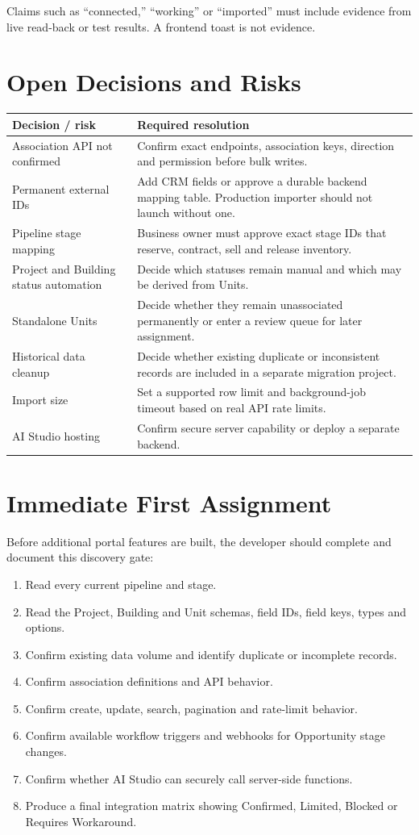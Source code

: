 \documentclass[10pt]{article}
\begin{document}
Claims such as ``connected,'' ``working'' or ``imported'' must include evidence from live read-back or test results. A frontend toast is not evidence.

\section{Open Decisions and Risks}
\begin{longtable}{>{\raggedright\arraybackslash}p{2.0in}>{\raggedright\arraybackslash}p{4.65in}}
\toprule
Decision / risk & Required resolution\\
\midrule
Association API not confirmed & Confirm exact endpoints, association keys, direction and permission before bulk writes.\\
Permanent external IDs & Add CRM fields or approve a durable backend mapping table. Production importer should not launch without one.\\
Pipeline stage mapping & Business owner must approve exact stage IDs that reserve, contract, sell and release inventory.\\
Project and Building status automation & Decide which statuses remain manual and which may be derived from Units.\\
Standalone Units & Decide whether they remain unassociated permanently or enter a review queue for later assignment.\\
Historical data cleanup & Decide whether existing duplicate or inconsistent records are included in a separate migration project.\\
Import size & Set a supported row limit and background-job timeout based on real API rate limits.\\
AI Studio hosting & Confirm secure server capability or deploy a separate backend.\\
\bottomrule
\end{longtable}

\section{Immediate First Assignment}
Before additional portal features are built, the developer should complete and document this discovery gate:
\begin{enumerate}
\item Read every current pipeline and stage.
\item Read the Project, Building and Unit schemas, field IDs, field keys, types and options.
\item Confirm existing data volume and identify duplicate or incomplete records.
\item Confirm association definitions and API behavior.
\item Confirm create, update, search, pagination and rate-limit behavior.
\item Confirm available workflow triggers and webhooks for Opportunity stage changes.
\item Confirm whether AI Studio can securely call server-side functions.
\item Produce a final integration matrix showing Confirmed, Limited, Blocked or Requires Workaround.
\end{enumerate}
\end{document}
